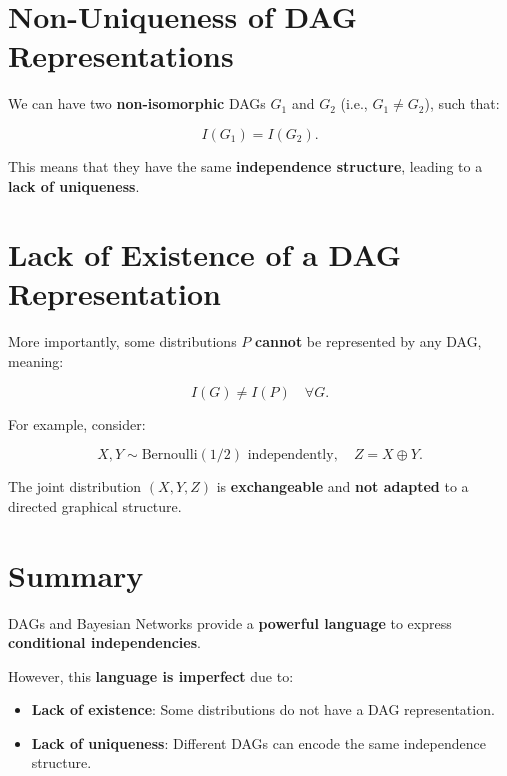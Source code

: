 \documentclass{article}%
\begin{document}
\section*{Non-Uniqueness of DAG Representations}
We can have two \textbf{non-isomorphic} DAGs \( G_1 \) and \( G_2 \) (i.e., \( G_1 \neq G_2 \)), such that:

\[
I(G_1) = I(G_2).
\]

This means that they have the same \textbf{independence structure}, leading to a \textbf{lack of uniqueness}.

\section*{Lack of Existence of a DAG Representation}
More importantly, some distributions \( P \) \textbf{cannot} be represented by any DAG, meaning:

\[
I(G) \neq I(P) \quad \forall G.
\]

For example, consider:

\[
X, Y \sim \text{Bernoulli}(1/2) \text{ independently}, \quad Z = X \oplus Y.
\]

The joint distribution \( (X, Y, Z) \) is \textbf{exchangeable} and \textbf{not adapted} to a directed graphical structure.

\section*{Summary}
DAGs and Bayesian Networks provide a \textbf{powerful language} to express \textbf{conditional independencies}.

However, this \textbf{language is imperfect} due to:
\begin{itemize}
    \item \textbf{Lack of existence}: Some distributions do not have a DAG representation.
    \item \textbf{Lack of uniqueness}: Different DAGs can encode the same independence structure.
\end{itemize}
\end{document}

